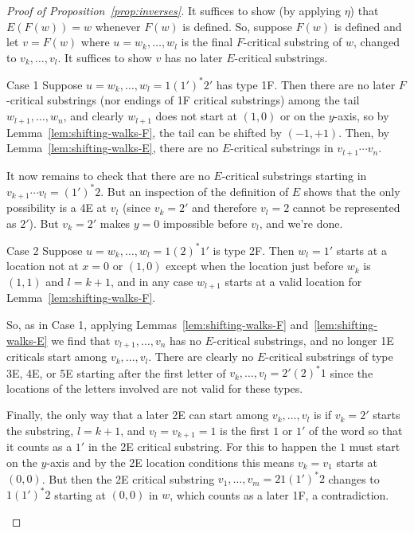 \documentclass[ALCO,ThmDefs,Unicode,epreuves]{cedram}
\begin{document}
\begin{proof}[Proof of Proposition~\ref{prop:inverses}]
It suffices to show (by applying $\eta$) that $E(F(w)) = w$ whenever $F(w)$ is defined. So, suppose $F(w)$ is defined and let $v=F(w)$ where $u=w_k,\ldots, w_l$ is the final $F$-critical substring of $w$, changed to $v_k,\ldots, v_l$. It suffices to show $v$ has no later $E$-critical substrings.


\begin{enonce*}[remark]{Case 1} Suppose $u=w_k,\ldots,w_l=1(1')^\ast 2'$ has type 1F. Then there are no later $F$-critical substrings (nor endings of 1F critical substrings) among the tail $w_{l+1},\ldots,w_n$, and clearly $w_{l+1}$ does not start at $(1,0)$ or on the $y$-axis, so by Lemma~\ref{lem:shifting-walks-F}, the tail can be shifted by $(-1,+1)$. Then, by Lemma~\ref{lem:shifting-walks-E}, there are no $E$-critical substrings in $v_{l+1} \cdots v_n$. 

It now remains to check that there are no $E$-critical substrings starting in $v_{k+1} \cdots v_l = (1')^*2$. But an inspection of the definition of $E$ shows that the only possibility is a 4E at $v_l$ (since $v_k=2'$ and therefore $v_l=2$ cannot be represented as $2'$). But $v_k=2'$ makes $y=0$ impossible before $v_l$, and we're done.
\end{enonce*}

\begin{enonce*}[remark]{Case 2} Suppose $u=w_k,\ldots,w_l=1(2)^\ast 1'$ is type 2F. Then $w_l=1'$ starts at a location not at $x=0$ or $(1,0)$ except when the location just before $w_k$ is $(1,1)$ and $l=k+1$, and in any case $w_{l+1}$ starts at a valid location for Lemma~\ref{lem:shifting-walks-F}. 

So, as in Case 1, applying Lemmas~\ref{lem:shifting-walks-F} and~\ref{lem:shifting-walks-E} we find that $v_{l+1},\ldots,v_n$ has no $E$-critical substrings, and no longer 1E criticals start among $v_k,\ldots,v_l$. There are clearly no $E$-critical substrings of type 3E, 4E, or 5E starting after the first letter of $v_k,\ldots,v_{l}=2'(2)^\ast 1$ since the locations of the letters involved are not valid for these types. 

Finally, the only way that a later 2E can start among $v_k,\ldots,v_l$ is if $v_k=2'$ starts the substring, $l=k+1$, and $v_l=v_{k+1}=1$ is the first $1$ or $1'$ of the word so that it counts as a $1'$ in the 2E critical substring. For this to happen the $1$ must start on the $y$-axis and by the 2E location conditions this means $v_k=v_1$ starts at $(0,0)$. But then the 2E critical substring $v_1,\ldots,v_m=21(1')^\ast 2$ changes to $1(1')^\ast 2$ starting at $(0,0)$ in $w$, which counts as a later 1F, a contradiction. 
\end{enonce*}


\end{proof}
\end{document}
